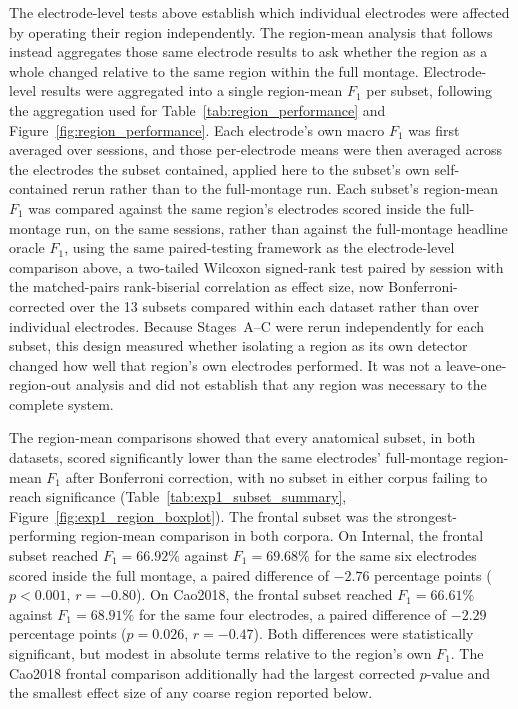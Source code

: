 The electrode-level tests above establish which individual electrodes were affected by operating their region independently. The region-mean analysis that follows instead aggregates those same electrode results to ask whether the region as a whole changed relative to the same region within the full montage. Electrode-level results were aggregated into a single region-mean $F_1$ per subset, following the aggregation used for Table~\ref{tab:region_performance} and Figure~\ref{fig:region_performance}. Each electrode's own macro $F_1$ was first averaged over sessions, and those per-electrode means were then averaged across the electrodes the subset contained, applied here to the subset's own self-contained rerun rather than to the full-montage run. Each subset's region-mean $F_1$ was compared against the same region's electrodes scored inside the full-montage run, on the same sessions, rather than against the full-montage headline oracle $F_1$, using the same paired-testing framework as the electrode-level comparison above, a two-tailed Wilcoxon signed-rank test paired by session with the matched-pairs rank-biserial correlation as effect size, now Bonferroni-corrected over the 13 subsets compared within each dataset rather than over individual electrodes. Because Stages~A--C were rerun independently for each subset, this design measured whether isolating a region as its own detector changed how well that region's own electrodes performed. It was not a leave-one-region-out analysis and did not establish that any region was necessary to the complete system.

The region-mean comparisons showed that every anatomical subset, in both datasets, scored significantly lower than the same electrodes' full-montage region-mean $F_1$ after Bonferroni correction, with no subset in either corpus failing to reach significance (Table~\ref{tab:exp1_subset_summary}, Figure~\ref{fig:exp1_region_boxplot}). The frontal subset was the strongest-performing region-mean comparison in both corpora. On Internal, the frontal subset reached $F_1=66.92\%$ against $F_1=69.68\%$ for the same six electrodes scored inside the full montage, a paired difference of $-2.76$ percentage points ($p<0.001$, $r=-0.80$). On Cao2018, the frontal subset reached $F_1=66.61\%$ against $F_1=68.91\%$ for the same four electrodes, a paired difference of $-2.29$ percentage points ($p=0.026$, $r=-0.47$). Both differences were statistically significant, but modest in absolute terms relative to the region's own $F_1$. The Cao2018 frontal comparison additionally had the largest corrected $p$-value and the smallest effect size of any coarse region reported below.

